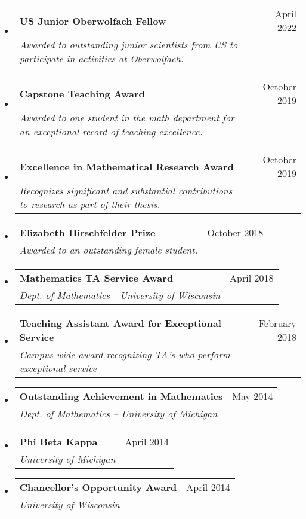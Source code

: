 \documentclass[letterpaper,11pt]{article}
\makeatletter
\newcommand{\ressubheading}[4]{
\begin{tabular*}{6.5in}[t]{l@{\cftdotfill{\cftsecdotsep}\extracolsep{\fill}}r}
		\textbf{#1} & #2 \\
		\textit{#3} & \textit{#4} \\
\end{tabular*}\vspace{-6pt}}
\makeatother
\begin{document}
\begin{itemize}
\item 
	\ressubheading{US Junior Oberwolfach Fellow}{April 2022}{Awarded to outstanding junior scientists from US to participate in activities at Oberwolfach.}{}

\item 
	\ressubheading{Capstone Teaching Award}{October 2019}{Awarded to one student in the math department for an exceptional record of teaching excellence.}{}

\item 
	\ressubheading{Excellence in Mathematical Research Award}{October 2019}{Recognizes significant and substantial contributions to research as part of their thesis.}{}

\item 
	\ressubheading{Elizabeth Hirschfelder Prize}{October 2018}{Awarded to an outstanding female student.}{} %

\item 
	\ressubheading{Mathematics TA Service Award}{April 2018}{Dept. of Mathematics - University of Wisconsin}{}
	
		
\item 
	\ressubheading{Teaching Assistant Award for Exceptional Service}{February 2018}{Campus-wide award recognizing TA's who perform exceptional service}{}
	
\item 
	\ressubheading{Outstanding Achievement in Mathematics}{May 2014}{Dept. of Mathematics -- University of Michigan}{}

\item 
	\ressubheading{Phi Beta Kappa}{April 2014}{University of Michigan}{}

\item 
	\ressubheading{Chancellor's Opportunity Award}{April 2014}{University of Wisconsin}{}

\end{itemize}
\end{document}
